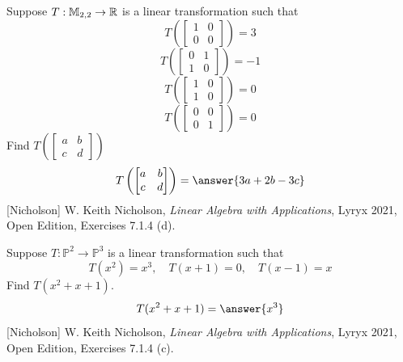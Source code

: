 \documentclass{ximera}
\begin{document}
\begin{exercise}
Suppose $T:\mathbb{M}_{2,2}\rightarrow \mathbb{R}$ is a linear transformation such that $$T\left(\begin{bmatrix}1 & 0\\0 & 0\end{bmatrix}\right)=3$$
$$T\left(\begin{bmatrix}0 & 1\\1 & 0\end{bmatrix}\right)=-1$$
$$T\left(\begin{bmatrix}1 & 0\\1 & 0\end{bmatrix}\right)=0$$
$$T\left(\begin{bmatrix}0 & 0\\0 & 1\end{bmatrix}\right)=0$$
Find $T\left(\begin{bmatrix}a & b\\c & d\end{bmatrix}\right)$
$$T\left(\begin{bmatrix}a & b\\c & d\end{bmatrix}\right)=\answer{3a+2b-3c}$$
[Nicholson] W. Keith Nicholson, {\it Linear Algebra with Applications}, Lyryx 2021, Open Edition, Exercises 7.1.4 (d).  
 \end{exercise}

\begin{exercise}
Suppose $T:\mathbb{P}^2\rightarrow \mathbb{P}^3$ is a linear transformation such that $$T(x^2)=x^3,\quad T(x+1)=0,\quad T(x-1)=x$$
Find $T(x^2+x+1)$.
$$T(x^2+x+1)=\answer{x^3}$$
[Nicholson] W. Keith Nicholson, {\it Linear Algebra with Applications}, Lyryx 2021, Open Edition, Exercises 7.1.4 (c).  
 \end{exercise}
\end{document}
